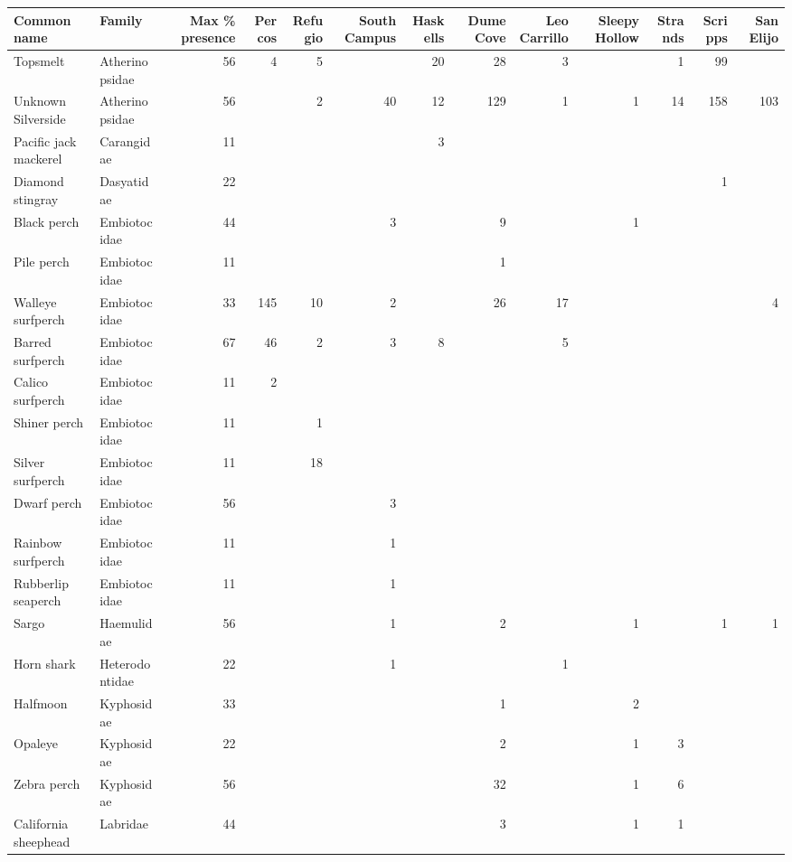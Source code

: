 \documentclass[]{article}
\begin{document}
\begin{table}[H]
\centering
\begin{tabular}{l|l|r|r|r|r|r|r|r|r|r|r|r}
\hline
Common name & Family & Max \% presence & Percos & Refugio & South Campus & Haskells & Dume Cove & Leo Carrillo & Sleepy Hollow & Strands & Scripps & San Elijo\\
\hline
Topsmelt & Atherinopsidae & 56 & 4 & 5 &  & 20 & 28 & 3 &  & 1 & 99 & \\
\hline
Unknown Silverside & Atherinopsidae & 56 &  & 2 & 40 & 12 & 129 & 1 & 1 & 14 & 158 & 103\\
\hline
Pacific jack mackerel & Carangidae & 11 &  &  &  & 3 &  &  &  &  &  & \\
\hline
Diamond stingray & Dasyatidae & 22 &  &  &  &  &  &  &  &  & 1 & \\
\hline
Black perch & Embiotocidae & 44 &  &  & 3 &  & 9 &  & 1 &  &  & \\
\hline
Pile perch & Embiotocidae & 11 &  &  &  &  & 1 &  &  &  &  & \\
\hline
Walleye surfperch & Embiotocidae & 33 & 145 & 10 & 2 &  & 26 & 17 &  &  &  & 4\\
\hline
Barred surfperch & Embiotocidae & 67 & 46 & 2 & 3 & 8 &  & 5 &  &  &  & \\
\hline
Calico surfperch & Embiotocidae & 11 & 2 &  &  &  &  &  &  &  &  & \\
\hline
Shiner perch & Embiotocidae & 11 &  & 1 &  &  &  &  &  &  &  & \\
\hline
Silver surfperch & Embiotocidae & 11 &  & 18 &  &  &  &  &  &  &  & \\
\hline
Dwarf perch & Embiotocidae & 56 &  &  & 3 &  &  &  &  &  &  & \\
\hline
Rainbow surfperch & Embiotocidae & 11 &  &  & 1 &  &  &  &  &  &  & \\
\hline
Rubberlip seaperch & Embiotocidae & 11 &  &  & 1 &  &  &  &  &  &  & \\
\hline
Sargo & Haemulidae & 56 &  &  & 1 &  & 2 &  & 1 &  & 1 & 1\\
\hline
Horn shark & Heterodontidae & 22 &  &  & 1 &  &  & 1 &  &  &  & \\
\hline
Halfmoon & Kyphosidae & 33 &  &  &  &  & 1 &  & 2 &  &  & \\
\hline
Opaleye & Kyphosidae & 22 &  &  &  &  & 2 &  & 1 & 3 &  & \\
\hline
Zebra perch & Kyphosidae & 56 &  &  &  &  & 32 &  & 1 & 6 &  & \\
\hline
California sheephead & Labridae & 44 &  &  &  &  & 3 &  & 1 & 1 &  & \\

\end{tabular}
\end{table}
\end{document}
